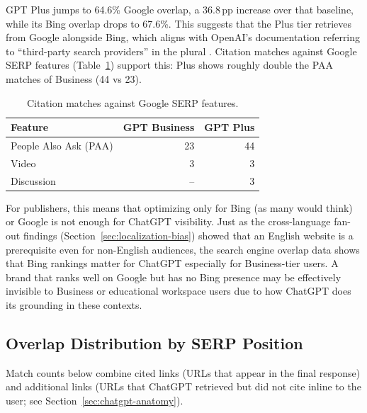GPT Plus jumps to 64.6\% Google overlap, a 36.8\,pp
increase over that baseline, while its Bing overlap drops to 67.6\%.
This suggests that the Plus tier retrieves from Google alongside Bing, which aligns with OpenAI's documentation referring to ``third-party search providers'' in the plural \parencite{openai2024search}. Citation matches against Google SERP features (Table~\ref{tab:serp-feature-matches}) support this: Plus shows roughly double the PAA matches of Business (44 vs 23). 

\begin{table}[H]
\centering
\caption{Citation matches against Google SERP features.}
\label{tab:serp-feature-matches}
\begin{tabular}{lrr}
\toprule
Feature & GPT Business & GPT Plus \\
\midrule
People Also Ask (PAA) & 23 & 44 \\
Video & 3 & 3 \\
Discussion & -- & 3 \\
\bottomrule
\end{tabular}
\end{table}

For publishers, this means that optimizing only for Bing (as many would think) or Google is not 
enough for ChatGPT visibility. Just as the cross-language fan-out findings (Section~\ref{sec:localization-bias}) 
showed that an English website is a prerequisite even for non-English audiences, the search engine overlap  
data shows that Bing rankings matter for ChatGPT especially for Business-tier users.
A brand that ranks well on Google but has no Bing presence may be effectively invisible to Business or educational workspace users due to how ChatGPT does its grounding in these contexts.

\subsection{Overlap Distribution by SERP Position}
\label{sec:page-dist}
\label{sec:bing-page-dist}
\label{sec:google-page-dist}

Match counts below combine cited links (URLs that appear in the final response) and additional links (URLs that ChatGPT retrieved but did not cite inline to the user; see Section~\ref{sec:chatgpt-anatomy}).

